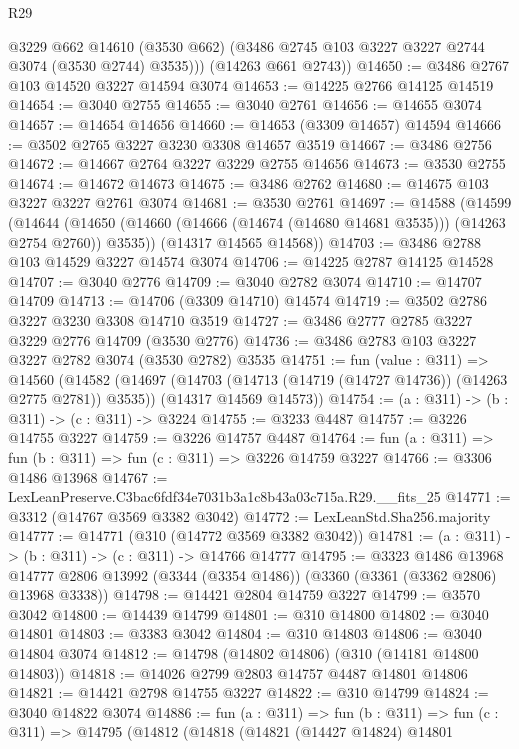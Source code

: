 \begin{lexlean}{R29}
\begin{coremodule}
          @3229
          @662
          @14610
          (@3530 @662)
          (@3486 @2745 @103 @3227 @3227 @2744 @3074 (@3530 @2744) @3535)))
      (@14263 @661 @2743))
@14650 := @3486 @2767 @103 @14520 @3227 @14594 @3074
@14653 := @14225 @2766 @14125 @14519
@14654 := @3040 @2755
@14655 := @3040 @2761
@14656 := @14655 @3074
@14657 := @14654 @14656
@14660 := @14653 (@3309 @14657) @14594
@14666 := @3502 @2765 @3227 @3230 @3308 @14657 @3519
@14667 := @3486 @2756
@14672 := @14667 @2764 @3227 @3229 @2755 @14656
@14673 := @3530 @2755
@14674 := @14672 @14673
@14675 := @3486 @2762
@14680 := @14675 @103 @3227 @3227 @2761 @3074
@14681 := @3530 @2761
@14697 := @14588
    (@14599
      (@14644 (@14650 (@14660 (@14666 (@14674 (@14680 @14681 @3535))) (@14263 @2754 @2760)) @3535))
      (@14317 @14565 @14568))
@14703 := @3486 @2788 @103 @14529 @3227 @14574 @3074
@14706 := @14225 @2787 @14125 @14528
@14707 := @3040 @2776
@14709 := @3040 @2782 @3074
@14710 := @14707 @14709
@14713 := @14706 (@3309 @14710) @14574
@14719 := @3502 @2786 @3227 @3230 @3308 @14710 @3519
@14727 := @3486 @2777 @2785 @3227 @3229 @2776 @14709 (@3530 @2776)
@14736 := @3486 @2783 @103 @3227 @3227 @2782 @3074 (@3530 @2782) @3535
@14751 := fun (value : @311) =>
  @14560
    (@14582
      (@14697 (@14703 (@14713 (@14719 (@14727 @14736)) (@14263 @2775 @2781)) @3535))
      (@14317 @14569 @14573))
@14754 := (a : @311) -> (b : @311) -> (c : @311) -> @3224
@14755 := @3233 @4487
@14757 := @3226 @14755 @3227
@14759 := @3226 @14757 @4487
@14764 := fun (a : @311) => fun (b : @311) => fun (c : @311) => @3226 @14759 @3227
@14766 := @3306 @1486 @13968
@14767 := LexLeanPreserve.C3bac6fdf34e7031b3a1c8b43a03c715a.R29.__fits_25
@14771 := @3312 (@14767 @3569 @3382 @3042)
@14772 := LexLeanStd.Sha256.majority
@14777 := @14771 (@310 (@14772 @3569 @3382 @3042))
@14781 := (a : @311) -> (b : @311) -> (c : @311) -> @14766 @14777
@14795 := @3323
    @1486
    @13968
    @14777
    @2806
    @13992
    (@3344 (@3354 @1486))
    (@3360 (@3361 (@3362 @2806) @13968 @3338))
@14798 := @14421 @2804 @14759 @3227
@14799 := @3570 @3042
@14800 := @14439 @14799
@14801 := @310 @14800
@14802 := @3040 @14801
@14803 := @3383 @3042
@14804 := @310 @14803
@14806 := @3040 @14804 @3074
@14812 := @14798 (@14802 @14806) (@310 (@14181 @14800 @14803))
@14818 := @14026 @2799 @2803 @14757 @4487 @14801 @14806
@14821 := @14421 @2798 @14755 @3227
@14822 := @310 @14799
@14824 := @3040 @14822 @3074
@14886 := fun (a : @311) =>
  fun (b : @311) =>
  fun (c : @311) =>
  @14795
    (@14812
      (@14818
        (@14821
          (@14427 @14824)
          @14801

\end{coremodule}
\end{lexlean}
